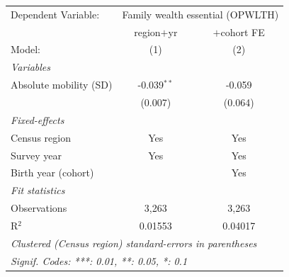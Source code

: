    \begin{tabular}{lcc}
      \tabularnewline \midrule \midrule
      Dependent Variable: & \multicolumn{2}{c}{Family wealth essential (OPWLTH)}\\
                             & region$+$yr   & $+$cohort FE \\   
      Model:                 & (1)           & (2)\\  
      \midrule
      \emph{Variables}\\
      Absolute mobility (SD) & -0.039$^{**}$ & -0.059\\   
                             & (0.007)       & (0.064)\\   
      \midrule
      \emph{Fixed-effects}\\
      Census region          & Yes           & Yes\\  
      Survey year            & Yes           & Yes\\  
      Birth year (cohort)    &               & Yes\\  
      \midrule
      \emph{Fit statistics}\\
      Observations           & 3,263         & 3,263\\  
      R$^2$                  & 0.01553       & 0.04017\\  
      \midrule \midrule
      \multicolumn{3}{l}{\emph{Clustered (Census region) standard-errors in parentheses}}\\
      \multicolumn{3}{l}{\emph{Signif. Codes: ***: 0.01, **: 0.05, *: 0.1}}\\
   \end{tabular}
\vspace{3pt}\par{}
